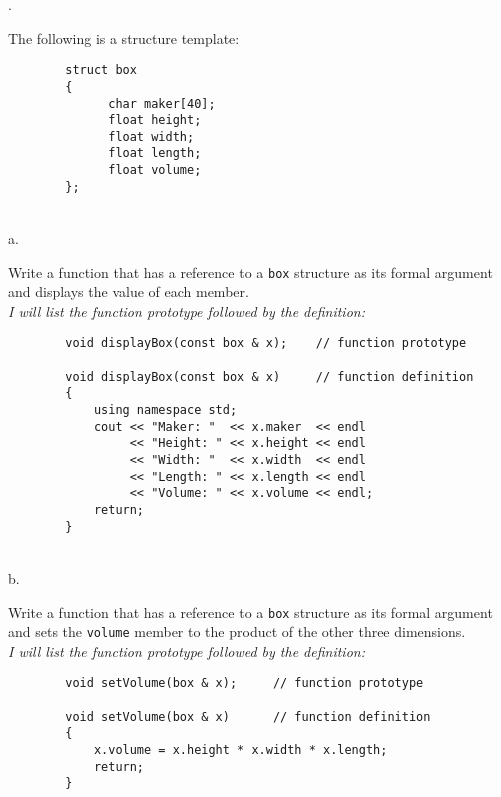 \documentclass{amsart}
\begin{document}
\phantom{\quad} \vfill
{}. 
\begin{minipage}[t]{11.5 cm}
	The following is a structure template:
	\begin{verbatim}
		struct box
		{
		      char maker[40];
		      float height;
		      float width;
		      float length;
		      float volume;
		};
	\end{verbatim}
\end{minipage} \\[3ex]
\phantom{1. }a.
\begin{minipage}[t]{11.5 cm}
	Write a function that has a reference to a \texttt{box} structure as its formal argument and displays the value of each member. \\[1ex]
	{\slshape I will list the function prototype followed by the definition:  }
	\begin{verbatim}
		void displayBox(const box & x);    // function prototype

		void displayBox(const box & x)     // function definition
		{
		    using namespace std;
		    cout << "Maker: "  << x.maker  << endl
		         << "Height: " << x.height << endl
		         << "Width: "  << x.width  << endl
		         << "Length: " << x.length << endl
		         << "Volume: " << x.volume << endl;
		    return;
		}
	\end{verbatim}
	{} %
\end{minipage} \\[3ex]
\phantom{1. }b.
\begin{minipage}[t]{11.5 cm}
	Write a function that has a reference to a \texttt{box} structure as its formal argument and sets the \texttt{volume} member to the product of the other three dimensions. \\[1ex]
	{\slshape I will list the function prototype followed by the definition:  }\\
	\begin{verbatim}
		void setVolume(box & x);     // function prototype

		void setVolume(box & x)      // function definition
		{
		    x.volume = x.height * x.width * x.length;
		    return;
		}
	\end{verbatim}
\end{minipage}
\vfill
\newpage
\end{document}
